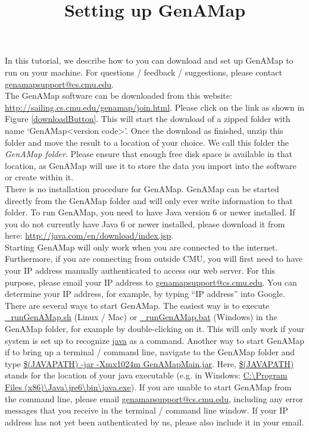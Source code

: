 \documentclass{article}
\title{Setting up GenAMap}
\author{}
\date{}
\begin{document}
\maketitle


In this tutorial, we describe how to you can download and set up GenAMap to run on your machine. For questions / feedback / suggestions, please contact \url{genamapsupport@cs.cmu.edu}.\\

The GenAMap software can be downloaded from this website: \url{http://sailing.cs.cmu.edu/genamap/join.html}. Please click on the link as shown in Figure \ref{downloadButton}. This will start the download of a zipped folder with name `GenAMap\textless version code\textgreater'. Once the download as finished, unzip this folder and move the result to a location of your choice. We call this folder the {\it GenAMap folder}. Please ensure that enough free disk space is available in that location, as GenAMap will use it to store the data you import into the software or create within it.\\

There is no installation procedure for GenAMap. GenAMap can be started directly from the GenAMap folder and will only ever write information to that folder. To run GenAMap, you need to have Java version 6 or newer installed. If you do not currently have Java 6 or newer installed, please download it from here: \url{http://java.com/en/download/index.jsp}.\\

Starting GenAMap will only work when you are connected to the internet. Furthermore, if you are connecting from outside CMU, you will first need to have your IP address manually authenticated to access our web server. For this purpose, please email your IP address to \url{genamapsupport@cs.cmu.edu}. You can determine your IP address, for example, by typing ``IP address'' into Google.\\

There are several ways to start GenAMap. The easiest way is to execute \url{_runGenAMap.sh} (Linux / Mac) or \url{_runGenAMap.bat} (Windows) in the GenAMap folder, for example by double-clicking on it. This will only work if your system is set up to recognize \url{java} as a command. Another way to start GenAMap if to bring up a terminal / command line, navigate to the GenAMap folder and type \url{$(JAVAPATH) -jar -Xmx1024m GenAMapMain.jar}. Here, \url{$(JAVAPATH)} stands for the location of your java executable (e.g. in Windows: \url{C:\Program Files (x86)\Java\jre6\bin\java.exe}). If you are unable to start GenAMap from the command line, please email \url{genamapsupport@cs.cmu.edu}, including any error messages that you receive in the terminal / command line window. If your IP address has not yet been authenticated by us, please also include it in your email.\\
\end{document}

